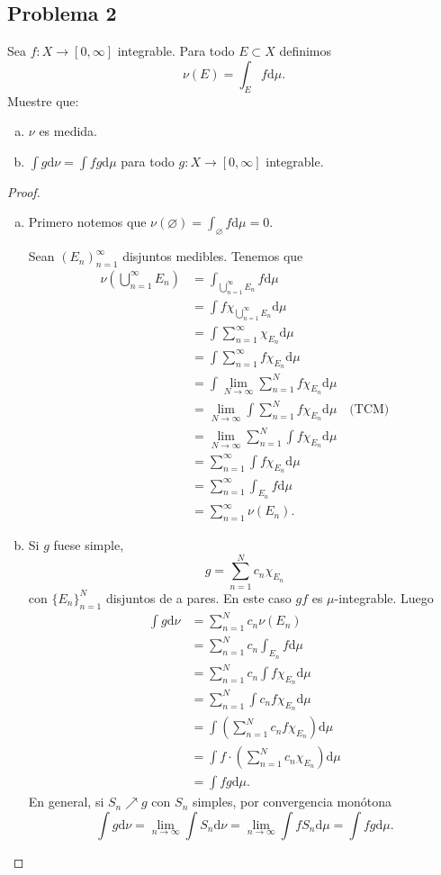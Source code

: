 \documentclass{article}
\theoremstyle{definition}
\theoremstyle{remark}
\numberwithin{equation}{section}
\renewcommand{\d}{\mathrm{d}}
\newcommand{\oo}{\infty}
\newcommand{\br}[1]{\left( #1 \right)}
\newcommand{\ds}{\displaystyle}
\begin{document}
\subsection{Problema 2}
Sea $f \colon X \to [0,\oo]$ integrable. Para todo $E \subset X$ definimos 
\[ \nu(E) = \int_E f \d\mu. \]
Muestre que: 
\begin{enumerate}[(a)]
  \item $\nu$ es medida.
  \item $\ds \int g \d\nu = \int fg \d\mu$ para todo $g \colon X \to [0,\oo]$ integrable.
\end{enumerate}
\begin{proof}
  \ 
  \begin{enumerate}[(a)]
    \item Primero notemos que $\ds \nu(\varnothing) = \int_\varnothing f \d\mu = 0$.
    
    Sean $(E_n)_{n=1}^\oo$ disjuntos medibles. Tenemos que 
    \begin{align*}
        \nu\br{\bigcup_{n=1}^\oo E_n}
        &= \int_{\bigcup_{n=1}^\oo E_n} f \d\mu \\
        &= \int f \chi_{\bigcup_{n=1}^\oo E_n} \d\mu \\
        &= \int \sum_{n=1}^\oo \chi_{E_n} \d\mu \\
        &= \int \sum_{n=1}^\oo f \chi_{E_n} \d\mu \\
        &= \int \lim_{N\to\oo} \sum_{n=1}^N f \chi_{E_n} \d\mu \\
        &= \lim_{N\to\oo} \int \sum_{n=1}^N f \chi_{E_n} \d\mu \quad \text{(TCM)} \\
        &= \lim_{N\to\oo} \sum_{n=1}^N \int f \chi_{E_n} \d\mu \\
        &= \sum_{n=1}^\oo \int f \chi_{E_n} \d\mu \\
        &= \sum_{n=1}^\oo \int_{E_n} f \d\mu \\
        &= \sum_{n=1}^\oo \nu(E_n).
    \end{align*}

    \item Si $g$ fuese simple, 
    \[ g = \sum_{n=1}^N c_n \chi_{E_n} \]
    con $\{E_n\}_{n=1}^N$ disjuntos de a pares. En este caso $g f$ es $\mu$-integrable. Luego 
    \begin{align*}
        \int g \d\nu &= \sum_{n=1}^N c_n \nu(E_n) \\
        &= \sum_{n=1}^N c_n \int_{E_n} f \d\mu \\
        &= \sum_{n=1}^N c_n \int f \chi_{E_n} \d\mu \\
        &= \sum_{n=1}^N \int c_n f \chi_{E_n} \d\mu \\
        &= \int \br{\sum_{n=1}^N c_n f \chi_{E_n}} \d\mu \\
        &= \int f \cdot \br{\sum_{n=1}^N c_n \chi_{E_n}} \d\mu \\
        &= \int fg \d\mu.
    \end{align*}
    En general, si $S_n \nearrow g$ con $S_n$ simples, por convergencia monótona 
    \[ \int g\d\nu = \lim_{n\to\oo} \int S_n \d\nu = \lim_{n\to\oo} \int f S_n \d\mu = \int fg \d\mu. \]
  \end{enumerate}
\end{proof}
\end{document}
